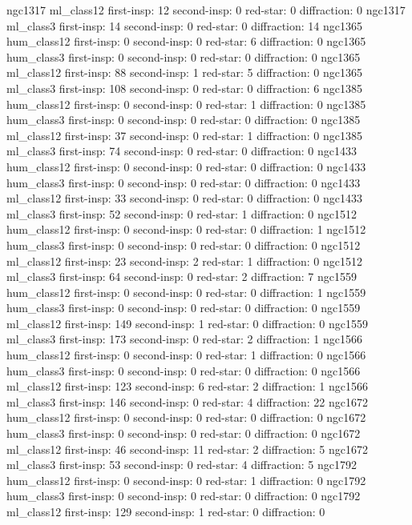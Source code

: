 ngc1317 ml_class12 first-insp: 12 second-insp:  0 red-star:  0 diffraction:  0
ngc1317 ml_class3 first-insp: 14 second-insp:  0 red-star:  0 diffraction:  14
ngc1365 hum_class12 first-insp: 0 second-insp:  0 red-star:  6 diffraction:  0
ngc1365 hum_class3 first-insp: 0 second-insp:  0 red-star:  0 diffraction:  0
ngc1365 ml_class12 first-insp: 88 second-insp:  1 red-star:  5 diffraction:  0
ngc1365 ml_class3 first-insp: 108 second-insp:  0 red-star:  0 diffraction:  6
ngc1385 hum_class12 first-insp: 0 second-insp:  0 red-star:  1 diffraction:  0
ngc1385 hum_class3 first-insp: 0 second-insp:  0 red-star:  0 diffraction:  0
ngc1385 ml_class12 first-insp: 37 second-insp:  0 red-star:  1 diffraction:  0
ngc1385 ml_class3 first-insp: 74 second-insp:  0 red-star:  0 diffraction:  0
ngc1433 hum_class12 first-insp: 0 second-insp:  0 red-star:  0 diffraction:  0
ngc1433 hum_class3 first-insp: 0 second-insp:  0 red-star:  0 diffraction:  0
ngc1433 ml_class12 first-insp: 33 second-insp:  0 red-star:  0 diffraction:  0
ngc1433 ml_class3 first-insp: 52 second-insp:  0 red-star:  1 diffraction:  0
ngc1512 hum_class12 first-insp: 0 second-insp:  0 red-star:  0 diffraction:  1
ngc1512 hum_class3 first-insp: 0 second-insp:  0 red-star:  0 diffraction:  0
ngc1512 ml_class12 first-insp: 23 second-insp:  2 red-star:  1 diffraction:  0
ngc1512 ml_class3 first-insp: 64 second-insp:  0 red-star:  2 diffraction:  7
ngc1559 hum_class12 first-insp: 0 second-insp:  0 red-star:  0 diffraction:  1
ngc1559 hum_class3 first-insp: 0 second-insp:  0 red-star:  0 diffraction:  0
ngc1559 ml_class12 first-insp: 149 second-insp:  1 red-star:  0 diffraction:  0
ngc1559 ml_class3 first-insp: 173 second-insp:  0 red-star:  2 diffraction:  1
ngc1566 hum_class12 first-insp: 0 second-insp:  0 red-star:  1 diffraction:  0
ngc1566 hum_class3 first-insp: 0 second-insp:  0 red-star:  0 diffraction:  0
ngc1566 ml_class12 first-insp: 123 second-insp:  6 red-star:  2 diffraction:  1
ngc1566 ml_class3 first-insp: 146 second-insp:  0 red-star:  4 diffraction:  22
ngc1672 hum_class12 first-insp: 0 second-insp:  0 red-star:  0 diffraction:  0
ngc1672 hum_class3 first-insp: 0 second-insp:  0 red-star:  0 diffraction:  0
ngc1672 ml_class12 first-insp: 46 second-insp:  11 red-star:  2 diffraction:  5
ngc1672 ml_class3 first-insp: 53 second-insp:  0 red-star:  4 diffraction:  5
ngc1792 hum_class12 first-insp: 0 second-insp:  0 red-star:  1 diffraction:  0
ngc1792 hum_class3 first-insp: 0 second-insp:  0 red-star:  0 diffraction:  0
ngc1792 ml_class12 first-insp: 129 second-insp:  1 red-star:  0 diffraction:  0
